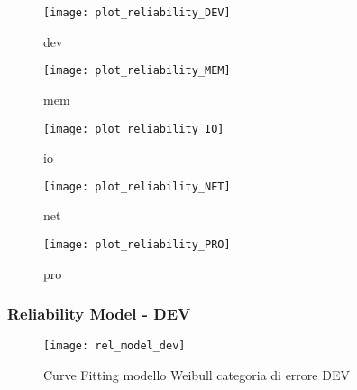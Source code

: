 \begin{minipage}{\linewidth}
  \centering
  \begin{minipage}{0.49\linewidth}
    \begin{figure}[H]
      \texttt{[image: plot\_reliability\_DEV]}
      \caption*{dev}
    \end{figure}
  \end{minipage}
  \begin{minipage}{0.49\linewidth}
    \begin{figure}[H]
      \texttt{[image: plot\_reliability\_MEM]}
      \caption*{mem}
    \end{figure}
  \end{minipage}
  \begin{minipage}{0.49\linewidth}
    \begin{figure}[H]
      \texttt{[image: plot\_reliability\_IO]}
      \caption*{io}
    \end{figure}
  \end{minipage}
  \begin{minipage}{0.49\linewidth}
    \begin{figure}[H]
      \texttt{[image: plot\_reliability\_NET]}
      \caption*{net}
    \end{figure}
  \end{minipage}
  \begin{minipage}{0.49\linewidth}
    \hspace{0.25\linewidth}
    \begin{figure}[H]
      \texttt{[image: plot\_reliability\_PRO]}
      \caption*{pro}
    \end{figure}
  \end{minipage}
\end{minipage}
\label{modello_reliability_e}

\clearpage

\subsubsection*{Reliability Model - DEV}

\begin{figure}[!htbp]
  \centering
  \texttt{[image: rel\_model\_dev]}
  \caption{Curve Fitting modello Weibull categoria di errore DEV}
  \label{rel_model_dev}
\end{figure}

